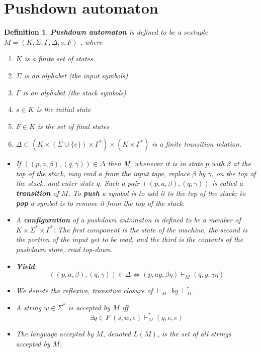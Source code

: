 \documentclass[aps,pra,onecolumn,notitlepage,superscriptaddress]{revtex4-1}
\def\y{\vdash}
\newtheorem{defi}{Definition}
\begin{document}
    \section{Pushdown automaton}
    \begin{defi}
        \textbf{Pushdown automaton} is defined to be a sextuple $M = ( K , \Sigma , \Gamma , \Delta, s , F )$ , where
        \begin{enumerate}
            \item $K$ is a finite set of states
            \item $\Sigma$ is an alphabet (the input symbols)
            \item $\Gamma$ is an alphabet (the stack symbols)
            \item $s \in K$ is the initial state
            \item $F \in K$ is the set of final states
            \item $\Delta \subset (K \times (\Sigma \cup \{e\}) \times \Gamma^*) \times (K \times \Gamma^*)$ is a finite transition relation.
        \end{enumerate}
        \begin{itemize}
            \item If $((p, a, \beta), (q, \gamma)) \in \Delta$ then M, whenever it is in state $p$ with $\beta$ at the top of the stack, may read $a$ from the input tape, replace $\beta$ by $\gamma$, on the top of the stack, and enter state $q$. Such a pair $((p, a, \beta), (q, \gamma))$ is called a \textbf{transition} of $M$. To \textbf{push} a symbol is to add it to the top of the stack; to \textbf{pop} a symbol is to remove it from the top of the stack.
            
            \item A \textbf{configuration} of a pushdown automaton is defined to be a member of $K \times \Sigma^* \times \Gamma^*$: The first component is the state of the machine, the second is the
            portion of the input yet to be read, and the third is the contents of the pushdown store, read top-down.

            \item \textbf{Yield} 
            \begin{equation}
                ((p, a, \beta), (q, \gamma)) \in \Delta \Longleftrightarrow (p, ay, \beta\eta) \y_M (q, y, \gamma\eta)
            \end{equation}

            \item We denote the reflexive, transitive closure of $\y_M$ by $\y_M^*$.

            \item A string $w \in \Sigma^*$ is accepted by $M$ iff
            \begin{equation}
                \exists q \in F \ (s, w, e) \y_M^* (q,e,e)
            \end{equation}

            \item The language accepted by $M$, denoted $L(M)$, is the set of all strings accepted by $M$.
        \end{itemize}
    \end{defi}
\end{document}
